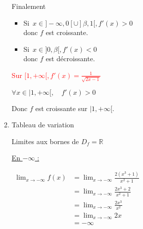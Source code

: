 \documentclass[12pt,a4paper]{article}
\begin{document}
\begin{enumerate}
\begin{enumerate}
                    Finalement
                    \begin{itemize}
                        \item Si \( \, x \in ] -\infty, 0 [ \cup ] \beta, 1 [ , f'(x   ) > 0\) \\
                              donc \( f \) est croissante.
                        \item Si \( \, x \in ] 0, \beta [ , f'(x) < 0\) \\
                              donc \( f \) est décroissante.
                    \end{itemize}
                    \textcolor{red}{Sur \( [1, +\infty[, f'(x) = \frac{1}{\sqrt{2x - 1}}\)}

                    \( \forall x \in |1, +\infty[, \quad f'(x) > 0 \)

                    Donc \( f \) est croissante sur \( |1, +\infty[ \).
              \item Tableau de variation
                    \begin{center}
                    \end{center}
                    Limites aux bornes de \( D_f = \mathbb{R} \)

                    \underline{En \( -\infty \) :}

                    \(
                    \begin{aligned}
                        \lim_{x \to -\infty} f(x) & = \lim_{x \to -\infty} \frac{2(x^3 + 1)}{x^2 + 1} \\
                                                  & = \lim_{x \to -\infty} \frac{2x^3 + 2}{x^2 + 1}   \\
                                                  & = \lim_{x \to -\infty} \frac{2x^3}{x^2}           \\
                                                  & = \lim_{x \to -\infty} 2x                         \\
                                                  & = -\infty
                    \end{aligned}
                    \)


\end{enumerate}
\end{enumerate}
\end{document}
